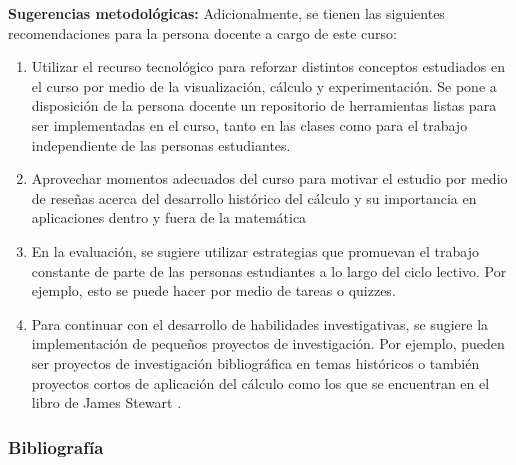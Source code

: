 \begin{refsection}
\textbf{Sugerencias metodológicas:} Adicionalmente, se tienen las siguientes recomendaciones para la persona docente a cargo de este curso:
\begin{enumerate}
    \item Utilizar el recurso tecnológico para reforzar distintos conceptos estudiados en el curso por medio de la visualización, cálculo y experimentación. Se pone a disposición de la persona docente un repositorio de herramientas listas para ser implementadas en el curso, tanto en las clases como para el trabajo independiente de las personas estudiantes.
    \item Aprovechar momentos adecuados del curso para motivar el estudio por medio de reseñas acerca del desarrollo histórico del cálculo y su importancia en aplicaciones dentro y fuera de la matemática
    \item En la evaluación, se sugiere utilizar estrategias que promuevan el trabajo constante de parte de las personas estudiantes a lo largo del ciclo lectivo. Por ejemplo, esto se puede hacer por medio de tareas o quizzes.
    \item Para continuar con el desarrollo de habilidades investigativas, se sugiere la implementación de pequeños proyectos de investigación. Por ejemplo, pueden ser proyectos de investigación bibliográfica en temas históricos o también proyectos cortos de aplicación del cálculo como los que se encuentran en el libro de James Stewart \cite{alcock2017mathematics}.
\end{enumerate}

\subsubsection*{Bibliografía}
\printbibliography[heading=subbibliography,section=\the\value{refsection}]
\end{refsection}
